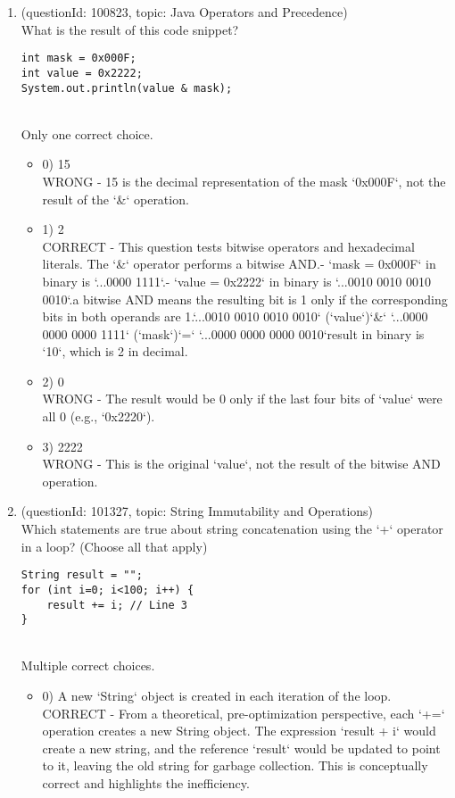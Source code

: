 \documentclass[12pt]{article}
\begin{document}
\begin{enumerate}[label=(\arabic*)]
\begin{itemize}
\end{itemize}
\item (questionId: 100823, topic: Java Operators and Precedence) \\ 
What is the result of this code snippet?\n\begin{verbatim}
int mask = 0x000F;
int value = 0x2222;
System.out.println(value & mask);
\end{verbatim}
\\ \noindent Only one correct choice. 
\begin{itemize}
\item 0) 15
 \\ 
WRONG - 15 is the decimal representation of the mask `0x000F`, not the result of the `&` operation.

\item 1) 2
 \\ 
CORRECT - This question tests bitwise operators and hexadecimal literals. The `&` operator performs a bitwise AND.\n- `mask = 0x000F` in binary is `...0000 1111`.\n- `value = 0x2222` in binary is `...0010 0010 0010 0010`.\nPerforming a bitwise AND means the resulting bit is 1 only if the corresponding bits in both operands are 1.\n   `...0010 0010 0010 0010` (`value`)\n`&`  `...0000 0000 0000 1111` (`mask`)\n`=`  `...0000 0000 0000 0010`\nThe result in binary is `10`, which is 2 in decimal.

\item 2) 0
 \\ 
WRONG - The result would be 0 only if the last four bits of `value` were all 0 (e.g., `0x2220`).

\item 3) 2222
 \\ 
WRONG - This is the original `value`, not the result of the bitwise AND operation.

\end{itemize}
\item (questionId: 101327, topic: String Immutability and Operations) \\ 
Which statements are true about string concatenation using the `+` operator in a loop? (Choose all that apply)
\begin{verbatim}
String result = "";
for (int i=0; i<100; i++) {
    result += i; // Line 3
}
\end{verbatim}
\\ \noindent Multiple correct choices. 
\begin{itemize}
\item 0) A new `String` object is created in each iteration of the loop.
 \\ 
CORRECT - From a theoretical, pre-optimization perspective, each `+=` operation creates a new String object. The expression `result + i` would create a new string, and the reference `result` would be updated to point to it, leaving the old string for garbage collection. This is conceptually correct and highlights the inefficiency.


\end{itemize}
\end{enumerate}
\end{document}
